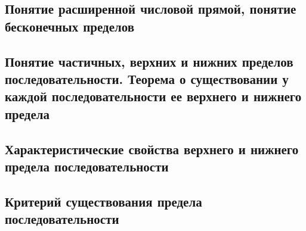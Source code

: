 \subsection{Понятие расширенной числовой прямой, понятие бесконечных пределов}
\subsection{Понятие частичных, верхних и нижних пределов последовательности. Теорема о существовании у каждой последовательности ее верхнего и нижнего предела}

\subsection{Характеристические свойства верхнего и нижнего предела последовательности}

\subsection{Критерий существования предела последовательности}


